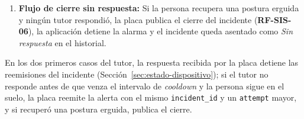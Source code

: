 \documentclass[12pt,a4paper,oneside]{book}
\theoremstyle{plain}
\theoremstyle{definition}
\theoremstyle{remark}
\begin{document}
\begin{enumerate}
\begin{itemize}
        \item \textit{Descarte por falsa alarma:} Si el tutor verifica que el adulto mayor se encuentra bien, presiona \texttt{Falsa Alarma}, silencia la notificación, publica el descarte en el tópico de respuesta (\textbf{RF-SIS-04}) y registra el evento descartado en el historial para su análisis en la Fase 6 de CRISP-ML(Q).
    \end{itemize}
    \item \textbf{Flujo de cierre sin respuesta:} Si la persona recupera una postura erguida y ningún tutor respondió, la placa publica el cierre del incidente (\textbf{RF-SIS-06}), la aplicación detiene la alarma y el incidente queda asentado como \textit{Sin respuesta} en el historial.
\end{enumerate}

En los dos primeros casos del tutor, la respuesta recibida por la placa detiene las reemisiones del incidente (Sección~\ref{sec:estado-dispositivo}); si el tutor no responde antes de que venza el intervalo de \textit{cooldown} y la persona sigue en el suelo, la placa reemite la alerta con el mismo \texttt{incident\_id} y un \texttt{attempt} mayor, y si recuperó una postura erguida, publica el cierre.
\end{document}
